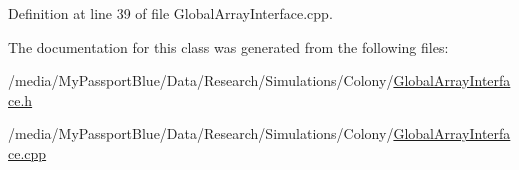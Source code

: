 \-Definition at line 39 of file \-Global\-Array\-Interface.\-cpp.



\-The documentation for this class was generated from the following files\-:\begin{DoxyCompactItemize}
\item 
/media/\-My\-Passport\-Blue/\-Data/\-Research/\-Simulations/\-Colony/\hyperlink{_global_array_interface_8h}{\-Global\-Array\-Interface.\-h}\item 
/media/\-My\-Passport\-Blue/\-Data/\-Research/\-Simulations/\-Colony/\hyperlink{_global_array_interface_8cpp}{\-Global\-Array\-Interface.\-cpp}\end{DoxyCompactItemize}

